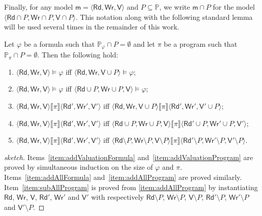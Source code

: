 \documentclass{llncs}
\newcommand{\modl}{\mathsf m}
\newcommand{\readset}{\mathsf{Rd}}
\newcommand{\valuset}{\mathsf{V}}
\newcommand{\writeset}{\mathsf{Wr}}
\newcommand{\intPgm}[1]{\llbracket #1 \rrbracket}
\renewcommand{\phi}{\varphi}
\newcommand{\propset}{\mathbb P}
\newcommand{\propsetOf}[1]{\propset_{#1}}
\newcommand{\modinter}{\cap}
\newcommand{\tuple}[1]{ \langle #1 \rangle}
\begin{document}
Finally, for any model $\modl = \tuple{\readset, \writeset, \valuset}$ and $P \subseteq \propset$, we write
$\modl \modinter P$ for the model $\tuple{\readset \cap P, \writeset \cap P, \valuset \cap P}$.
This notation along with the following standard lemma
will be used several times in the remainder of this work.

\begin{lemma}\label{theo:irrelevantVariables}
Let $\phi$ be a formula such that $\propsetOf \phi \cap P = \emptyset$ and
let $ \pi$ be a program such that $\propsetOf \pi \cap P = \emptyset$. Then the following hold:
\begin{enumerate}
\item\label{item:addValuationFormula}
$\tuple{\readset,\writeset,\valuset} \models \phi $ iff
$\tuple{\readset,\writeset,\valuset\cup P} \models \phi$;
\item\label{item:addAllFormula}
$\tuple{\readset,\writeset,\valuset} \models \phi $ iff
$\tuple{\readset\cup P,\writeset\cup P,\valuset} \models \phi$;
\item\label{item:addValuationProgram}
$\tuple{\readset,\writeset,\valuset} \intPgm \pi \tuple{\readset',\writeset',\valuset'} $ iff
$\tuple{\readset,\writeset,\valuset\cup P} \intPgm \pi \tuple{\readset',\writeset',\valuset'\cup P} $;
\item\label{item:addAllProgram}
$\tuple{\readset,\writeset,\valuset} \intPgm \pi \tuple{\readset',\writeset',\valuset'} $ iff
$\tuple{\readset\cup P,\writeset\cup P,\valuset} \intPgm \pi \tuple{\readset'\cup P,\writeset'\cup P,\valuset'} $;
\item\label{item:subAllProgram}
$\tuple{\readset,\writeset,\valuset} \intPgm \pi \tuple{\readset',\writeset',\valuset'} $ iff
$\tuple{\readset\setminus P,\writeset\setminus P,\valuset\setminus P} \intPgm \pi \tuple{\readset'\setminus P,\writeset'\setminus P,\valuset'\setminus P} $.
\end{enumerate}
\end{lemma}
\begin{proof}[sketch]
Items~\ref{item:addValuationFormula} and~\ref{item:addValuationProgram} are proved by simultaneous
induction on the size of $\phi$ and $\pi$.
Items~\ref{item:addAllFormula} and~\ref{item:addAllProgram} are proved similarly.
Item~\ref{item:subAllProgram} is proved from \ref{item:addAllProgram} by instantiating $\readset$,
$\writeset$, $\valuset$, $\readset'$, $\writeset'$ and $\valuset'$ with respectively
$\readset\setminus P$, $\writeset\setminus P$, $\valuset\setminus P$, $\readset'\setminus P$,
$\writeset'\setminus P$ and $\valuset'\setminus P$.
\end{proof}
\end{document}
